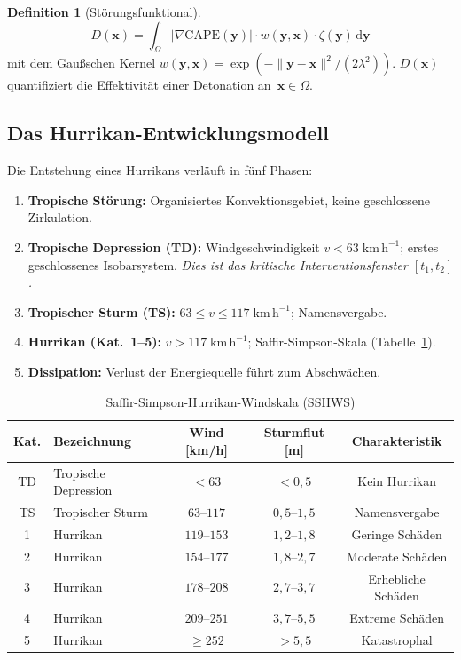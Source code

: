 ﻿\documentclass[a4paper,12pt]{article}
\theoremstyle{definition}
\newtheorem{definition}{Definition}
\begin{document}
\begin{definition}[St\"{o}rungsfunktional]
\label{def:stoer}
\[
    D(\mathbf{x}) =
    \int_{\Omega}
    \bigl|\nabla\mathrm{CAPE}(\mathbf{y})\bigr|\cdot
    w(\mathbf{y},\mathbf{x})\cdot\zeta(\mathbf{y})\,\mathrm{d}\mathbf{y}
\]
mit dem Gau\ss{}schen Kernel
$w(\mathbf{y},\mathbf{x})=\exp(-\|\mathbf{y}-\mathbf{x}\|^{2}/(2\lambda^{2}))$.
$D(\mathbf{x})$ quantifiziert die Effektivit\"{a}t einer Detonation
an~$\mathbf{x}\in\Omega$.
\end{definition}

\subsection{Das Hurrikan-Entwicklungsmodell}

Die Entstehung eines Hurrikans verl\"{a}uft in f\"{u}nf Phasen:
\begin{enumerate}
    \item \textbf{Tropische St\"{o}rung:} Organisiertes Konvektionsgebiet,
          keine geschlossene Zirkulation.
    \item \textbf{Tropische Depression (TD):} Windgeschwindigkeit
          $v<63\;\mathrm{km\,h}^{-1}$; erstes geschlossenes Isobarsystem.
          \emph{Dies ist das kritische Interventionsfenster $[t_{1},t_{2}]$.}
    \item \textbf{Tropischer Sturm (TS):} $63\leq v\leq 117\;\mathrm{km\,h}^{-1}$;
          Namensvergabe.
    \item \textbf{Hurrikan (Kat.\ 1--5):} $v>117\;\mathrm{km\,h}^{-1}$;
          Saffir-Simpson-Skala (Tabelle~\ref{tab:saffir}).
    \item \textbf{Dissipation:} Verlust der Energiequelle f\"{u}hrt zum
          Abschw\"{a}chen.
\end{enumerate}

\begin{table}[H]
\centering
\caption{Saffir-Simpson-Hurrikan-Windskala (SSHWS)}
\label{tab:saffir}
\begin{tabular}{clccc}
\toprule
Kat. & Bezeichnung & Wind [km/h] & Sturmflut [m] & Charakteristik\\
\midrule
TD & Tropische Depression & $<63$ & $<0{,}5$ & Kein Hurrikan\\
TS & Tropischer Sturm & $63$--$117$ & $0{,}5$--$1{,}5$ & Namensvergabe\\
1 & Hurrikan & $119$--$153$ & $1{,}2$--$1{,}8$ & Geringe Sch\"{a}den\\
2 & Hurrikan & $154$--$177$ & $1{,}8$--$2{,}7$ & Moderate Sch\"{a}den\\
3 & Hurrikan & $178$--$208$ & $2{,}7$--$3{,}7$ & Erhebliche Sch\"{a}den\\
4 & Hurrikan & $209$--$251$ & $3{,}7$--$5{,}5$ & Extreme Sch\"{a}den\\
5 & Hurrikan & $\geq252$ & $>5{,}5$ & Katastrophal\\
\bottomrule
\end{tabular}
\end{table}
\end{document}
